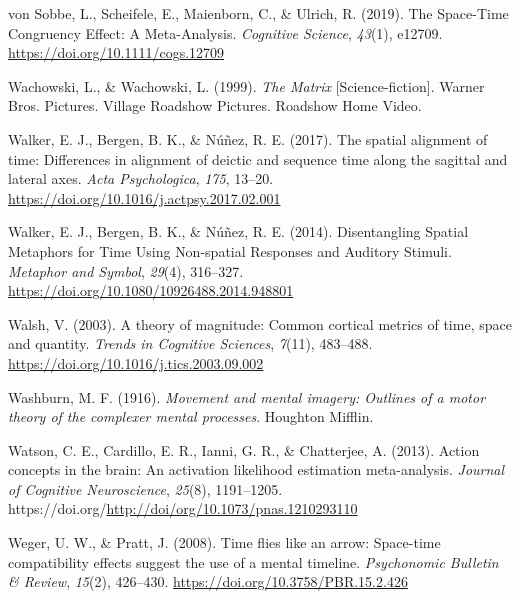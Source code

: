 \documentclass[
  a4paper,12pt,twoside,onecolumn,openright,final,oldfontcommands]{memoir}
\newlength{\cslhangindent}
\newlength{\cslentryspacingunit} %
\newenvironment{CSLReferences}[2] %
 {%
  \setlength{\parindent}{0pt}
  \ifodd #1
  \let\oldpar\par
  \def\par{\hangindent=\cslhangindent\oldpar}
  \fi
  \setlength{\parskip}{#2\cslentryspacingunit}
 }%
 {}
\begin{document}
\begin{CSLReferences}{1}{0}
\leavevmode{}%
von Sobbe, L., Scheifele, E., Maienborn, C., \& Ulrich, R. (2019). The {Space}-{Time} {Congruency} {Effect}: {A} {Meta}-{Analysis}. \emph{Cognitive Science}, \emph{43}(1), e12709. \url{https://doi.org/10.1111/cogs.12709}

\leavevmode{}%
Wachowski, L., \& Wachowski, L. (1999). \emph{The {Matrix}} {[}Science-fiction{]}. Warner Bros. Pictures. Village Roadshow Pictures. Roadshow Home Video.

\leavevmode{}%
Walker, E. J., Bergen, B. K., \& Núñez, R. E. (2017). The spatial alignment of time: {Differences} in alignment of deictic and sequence time along the sagittal and lateral axes. \emph{Acta Psychologica}, \emph{175}, 13--20. \url{https://doi.org/10.1016/j.actpsy.2017.02.001}

\leavevmode{}%
Walker, E. J., Bergen, B. K., \& Núñez, R. E. (2014). Disentangling {Spatial} {Metaphors} for {Time} {Using} {Non}-spatial {Responses} and {Auditory} {Stimuli}. \emph{Metaphor and Symbol}, \emph{29}(4), 316--327. \url{https://doi.org/10.1080/10926488.2014.948801}

\leavevmode{}%
Walsh, V. (2003). A theory of magnitude: Common cortical metrics of time, space and quantity. \emph{Trends in Cognitive Sciences}, \emph{7}(11), 483--488. \url{https://doi.org/10.1016/j.tics.2003.09.002}

\leavevmode{}%
Washburn, M. F. (1916). \emph{Movement and mental imagery: {Outlines} of a motor theory of the complexer mental processes}. Houghton Mifflin.

\leavevmode{}%
Watson, C. E., Cardillo, E. R., Ianni, G. R., \& Chatterjee, A. (2013). Action concepts in the brain: An activation likelihood estimation meta-analysis. \emph{Journal of Cognitive Neuroscience}, \emph{25}(8), 1191--1205. https://doi.org/\url{http://doi/org/10.1073/pnas.1210293110}

\leavevmode{}%
Weger, U. W., \& Pratt, J. (2008). Time flies like an arrow: {Space}-time compatibility effects suggest the use of a mental timeline. \emph{Psychonomic Bulletin \& Review}, \emph{15}(2), 426--430. \url{https://doi.org/10.3758/PBR.15.2.426}


\end{CSLReferences}
\end{document}
